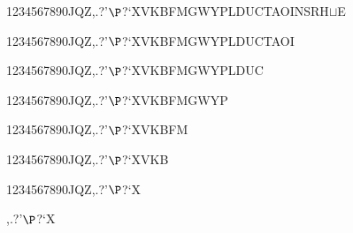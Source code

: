 \documentclass[12pt]{article}
\begin{document}
\begin{tt}
\begin{small}
\begin{bundle}{}
{\begin{bundle}{1234567890JQZ,.?'$\P$?`XVKBFMGWYPLDUCTAOINSRH$\sqcup$E}
{\begin{bundle}{1234567890JQZ,.?'$\P$?`XVKBFMGWYPLDUCTAOI}
{\begin{bundle}{1234567890JQZ,.?'$\P$?`XVKBFMGWYPLDUC}
{\begin{bundle}{1234567890JQZ,.?'$\P$?`XVKBFMGWYP}
{\begin{bundle}{1234567890JQZ,.?'$\P$?`XVKBFM}
{\begin{bundle}{1234567890JQZ,.?'$\P$?`XVKB}
{\begin{bundle}{1234567890JQZ,.?'$\P$?`X}
{\begin{bundle}{,.?'$\P$?`X}
\end{bundle}}
\end{bundle}}
\end{bundle}}
\end{bundle}}
\end{bundle}}
\end{bundle}}
\end{bundle}}
\end{bundle}}
\end{bundle}
\end{small}
\end{tt}
\end{document}
